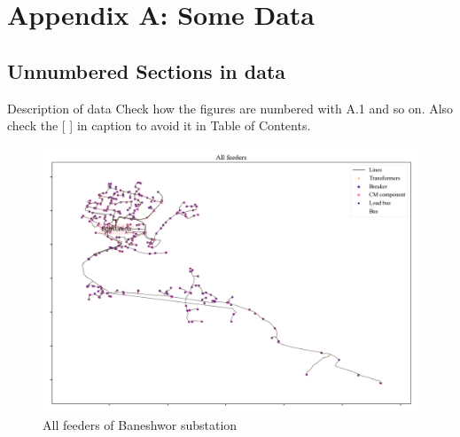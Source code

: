 \chapter*{Appendix A: Some Data} %
\label{app-bss-feeders} 
{}

\section*{Unnumbered Sections in data}
Description of data
Check how the figures are numbered with A.1 and so on.
Also check the [ ] in caption to avoid it in Table of Contents.

 \begin{figure}[H]
    \centering
    \includegraphics[angle=0, width=1\textwidth, keepaspectratio]{Figures/A/0.png}
    \caption[]{All feeders of Baneshwor substation}
    \label{app_A_1}
\end{figure}

